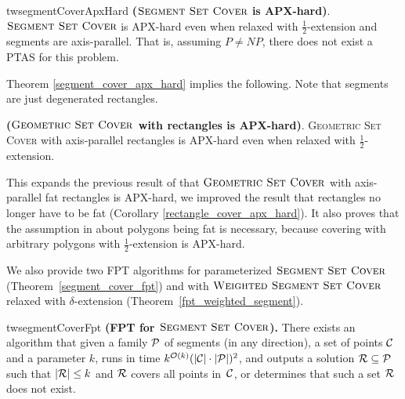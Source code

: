 \begin{restatable}{tw}{segmentCoverApxHard}{
\label{segment_cover_apx_hard}
	\textbf{($\textsc{Segment Set Cover}$ is APX-hard)}.	
	$\textsc{Segment Set Cover}$
	is APX-hard even when 
	relaxed with $\frac{1}{2}$-extension
	and segments are axis-parallel.
	That is, assuming $P\neq NP$, there does not exist a PTAS
	for this problem.
}\end{restatable}

Theorem \ref{segment_cover_apx_hard} implies the following.
Note that segments are just degenerated rectangles.

\begin{corollary}{
\label{rectangle_cover_apx_hard}
	\textbf{($\textsc{Geometric Set Cover}$ with rectangles is APX-hard)}.	
	\textsc{Geometric} \textsc{Set} \textsc{Cover}
	with axis-parallel rectangles is APX-hard
	even when relaxed with $\frac{1}{2}$-extension.
}\end{corollary}

This expands the previous result of \cite{rectangles_apx_hard} 
that $\textsc{Geometric Set Cover}$
with axis-parallel fat rectangles is APX-hard,
we improved the result that rectangles no longer
have to be fat (Corollary \ref{rectangle_cover_apx_hard}).
It also proves that the assumption in \cite{harpeled12}
about polygons being fat is necessary, because
covering with arbitrary polygons with $\frac{1}{2}$-extension is APX-hard.

We also provide two FPT algorithms for parameterized $\textsc{Segment Set Cover}$ 	
(Theorem~\ref{segment_cover_fpt})
and with $\textsc{Weighted Segment Set Cover}$ relaxed with $\delta$-extension
(Theorem~\ref{fpt_weighted_segment}).

\begin{restatable}{tw}{segmentCoverFpt}{
	\label{segment_cover_fpt}
	\textbf{(FPT for $\textsc{Segment Set Cover}$).}
	There exists an algorithm that given a family $\mathcal{P}$ of
	segments (in any direction),
	a set of points $\mathcal{C}$
	and a parameter $k$,
	runs in time ${k^{\mathcal{O}(k)} (|\mathcal{C}|\cdot|\mathcal{P}|)^2}$,
	and outputs a solution $\mathcal{R} \subseteq \mathcal{P}$
	such that $|\mathcal{R}| \le k$ and $\mathcal{R}$ covers all points in~$\mathcal{C}$,
	or determines that such a set $\mathcal{R}$ does not exist.
}\end{restatable}

